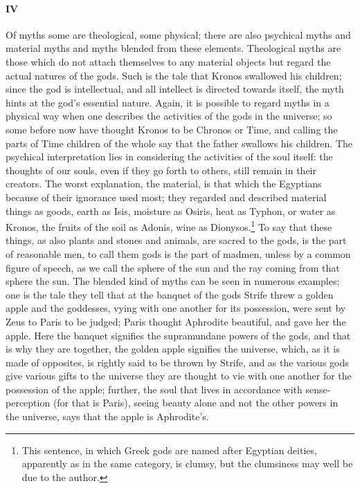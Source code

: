 \documentclass[12pt]{article}
\begin{document}
\paragraph{IV} Of myths some are theological, some physical; there are also
psychical myths and material myths and myths blended from these elements.
Theological myths are those which do not attach themselves to any material
objects but regard the actual natures of the gods. Such is the tale that Kronos
swallowed his children; since the god is intellectual, and all intellect is
directed towards itself, the myth hints at the god's essential nature. Again,
it is possible to regard myths in a physical way when one describes the
activities of the gods in the universe; so some before now have thought Kronos
to be Chronos or Time, and calling the parts of Time children of the whole say
that the father swallows his children. The psychical interpretation lies in
considering the activities of the soul itself: the thoughts of our souls, even
if they go forth to others, still remain in their creators. The worst
explanation, the material, is that which the Egyptians because of their
ignorance used most; they regarded and described material things as goods,
earth as Isis, moisture as Osiris, heat as Typhon, or water as Kronos, the
fruits of the soil as Adonis, wine as Dionysos.\footnote{This sentence, in
which Greek gods are named after Egyptian deities, apparently as in the same
category, is clumsy, but the clumsiness may well be due to the author.} To say
that these things, as also plants and stones and animals, are sacred to the
gods, is the part of reasonable men, to call them gods is the part of madmen,
unless by a common figure of speech, as we call the sphere of the sun and the
ray coming from that sphere the sun. The blended kind of myths can be seen in
numerous examples; one is the tale they tell that at the banquet of the gods
Strife threw a golden apple and the goddesses, vying with one another for its
possession, were sent by Zeus to Paris to be judged; Paris thought Aphrodite
beautiful, and gave her the apple. Here the banquet signifies the supramundane
powers of the gods, and that is why they are together, the golden apple
signifies the universe, which, as it is made of opposites, is rightly said to
be thrown by Strife, and as the various gods give various gifts to the universe
they are thought to vie with one another for the possession of the apple;
further, the soul that lives in accordance with sense-perception (for that is
Paris), seeing beauty alone and not the other powers in the universe, says that
the apple is Aphrodite's.
\end{document}
